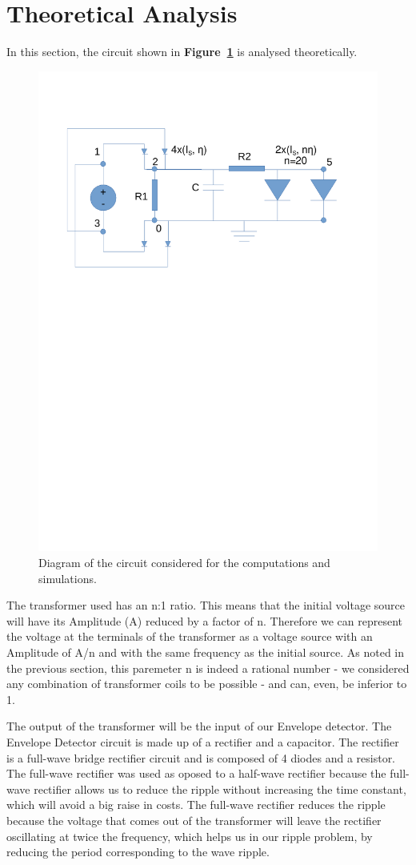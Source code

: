 \section{Theoretical Analysis}
\label{sec:analysis}

In this section, the circuit shown in \textbf{Figure~\ref{fig:diagram_t3}} is analysed
theoretically.
\begin{figure}[H] \centering
\includegraphics[width=0.6\linewidth]{diagram_t3.pdf}
\vspace{-6cm}
\caption{Diagram of the circuit considered for the computations and simulations.}
\label{fig:diagram_t3}
\end{figure}

The transformer used has an n:1 ratio. This means that the initial voltage source will have its Amplitude (A) reduced by a factor of n. Therefore we can represent the voltage at the terminals of the transformer as a voltage source with an Amplitude of A/n and with the same frequency as the initial source. As noted in the previous section, this paremeter n is indeed a rational number - we considered any combination of transformer coils to be possible - and can, even, be inferior to 1.

The output of the transformer will be the input of our Envelope detector. The Envelope Detector circuit is made up of a rectifier and a capacitor. The rectifier is a full-wave bridge rectifier circuit and is composed of 4 diodes and a resistor. The full-wave rectifier was used as oposed to a half-wave rectifier because the full-wave rectifier allows us to reduce the ripple without increasing the time constant, which will avoid a big raise in costs. The full-wave rectifier reduces the ripple because the voltage that comes out of the transformer will leave the rectifier oscillating at twice the frequency, which helps us in our ripple problem, by reducing the period corresponding to the wave ripple.

